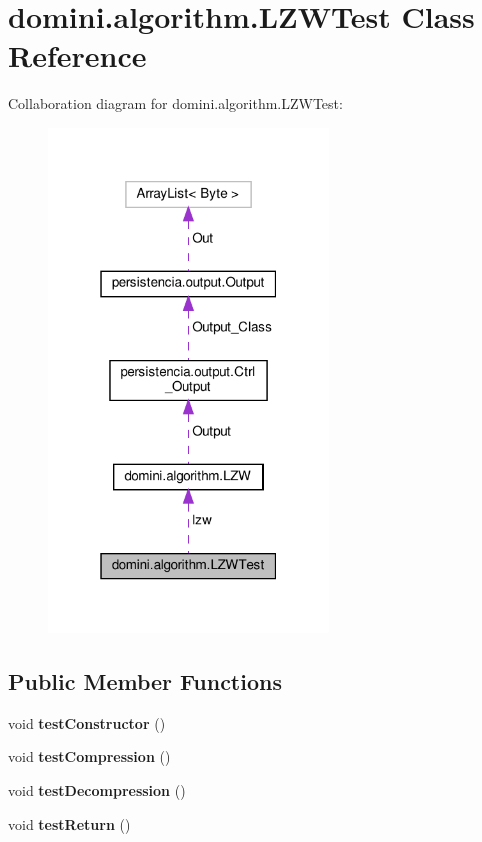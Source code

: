 \hypertarget{classdomini_1_1algorithm_1_1LZWTest}{}\section{domini.\+algorithm.\+L\+Z\+W\+Test Class Reference}
\label{classdomini_1_1algorithm_1_1LZWTest}


Collaboration diagram for domini.\+algorithm.\+L\+Z\+W\+Test\+:\nopagebreak
\begin{figure}[H]
\begin{center}
\leavevmode
\includegraphics[width=211pt]{classdomini_1_1algorithm_1_1LZWTest__coll__graph}
\end{center}
\end{figure}
\subsection*{Public Member Functions}
\begin{DoxyCompactItemize}
\item 
\mbox{\label{classdomini_1_1algorithm_1_1LZWTest_a7c9c06d11571cf8ebcaff5404c920e30}} 
void {\bfseries test\+Constructor} ()
\item 
\mbox{\label{classdomini_1_1algorithm_1_1LZWTest_a83d521e2900616a43a01e02fc54e6e02}} 
void {\bfseries test\+Compression} ()
\item 
\mbox{\label{classdomini_1_1algorithm_1_1LZWTest_abec7c3f2f555e72270904c5fba516fc9}} 
void {\bfseries test\+Decompression} ()
\item 
\mbox{\label{classdomini_1_1algorithm_1_1LZWTest_a9c12c40702a978985f84dc7feece791e}} 
void {\bfseries test\+Return} ()
\end{DoxyCompactItemize}
